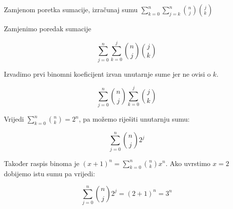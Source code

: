 \documentclass{article}
\begin{document}
	Zamjenom poretka sumacije, izračunaj sumu \( \displaystyle \sum\limits^n_{k=0} \sum\limits^n_{j=k} \binom{n}{j} \binom{j}{k} \)
	
	Zamjenimo poredak sumacije
	
	\[ \sum\limits^n_{j=0} \sum\limits^j_{k=0} \binom{n}{j} \binom{j}{k} \]
	
	Izvadimo prvi binomni koeficijent izvan unutarnje sume jer ne ovisi o \( k \).
	
	\[ \sum\limits^n_{j=0} \binom{n}{j} \sum\limits^j_{k=0} \binom{j}{k} \]
	
	Vrijedi \( \displaystyle \sum\limits^n_{k=0} \binom{n}{k} = 2^n \), pa možemo riješiti unutarnju sumu:
	
	\[ \sum\limits^n_{j=0} \binom{n}{j} 2^j \]
	
	Također raspis binoma je \( \displaystyle (x + 1)^n = \sum\limits^n_{k=0} \binom{n}{k} x^n \). Ako uvrstimo \( x = 2 \) dobijemo istu sumu pa vrijedi:
	
	\[ \sum\limits^n_{j=0} \binom{n}{j} 2^j = (2 + 1)^n = 3^n \]
\end{document}
